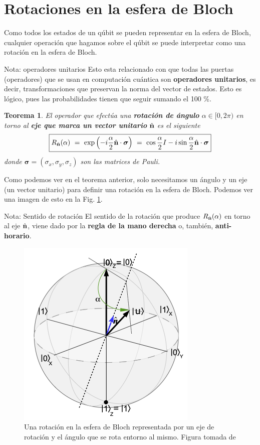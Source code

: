 \documentclass[a4paper,11pt]{book} %
\newtheorem{teorema_contador}{Teorema}
\newcommand{\Teorema}[1]{
		\begin{mybox_gray2}{}
			\begin{teorema_contador}
				 #1 
			\end{teorema_contador} 
		\end{mybox_gray2}
	}
\numberwithin{equation}{chapter}
\begin{document}
    \section{Rotaciones en la esfera de Bloch}

Como todos los estados de un qúbit se pueden representar en la esfera de Bloch, cualquier operación que hagamos sobre el qúbit se puede interpretar como una rotación en la esfera de Bloch.

	\begin{mybox_blue}{Nota: operadores unitarios}
	Esto esta relacionado con que todas las puertas (operadores) que se usan en computación cuántica son 
	\textbf{operadores unitarios}, es decir, transformaciones que preservan la norma
	del vector de estados. Esto es lógico, pues las probabilidades tienen que seguir 
	sumando el 100 \%. 
	\end{mybox_blue}
	

	\Teorema{
	El operador que efectúa una \textbf{rotación de ángulo}  $\alpha\in [0,2\pi)$ en torno al 
	\textbf{eje que marca un vector unitario} $\hat{\bf n}$ es el siguiente
	\begin{equation} \label{ec_puertas_simples_Rn}
	\boxed{R_{\hat{\bf n}}(\alpha)~ = ~\exp\left( -i\frac{\alpha}{2} \hat{\bf n}\cdot 
	\boldsymbol{\sigma} \right) ~=~ \cos \frac{\alpha}{2} I - i \sin\frac{\alpha}{2} 
	\hat{\bf n}\cdot\boldsymbol{\sigma} }
	\end{equation}
	donde $\boldsymbol{\sigma} = (\sigma_x, \sigma_y, \sigma_z)$ son las matrices de Pauli.
	}
	
Como podemos ver en el teorema anterior, solo necesitamos un ángulo y un eje (un vector unitario) para definir una rotación en la esfera de Bloch. Podemos ver una imagen de esto en la Fig. \ref{Fig_puertas_simples_BlochSphere_rot.png}. 


	\begin{mybox_blue}{Nota: Sentido de rotación}
	El sentido de la rotación que produce $R_{\hat{\bf n}}(\alpha)$ en torno al eje 
	$\hat{\bf n}$, viene dado por la \textbf{regla de la mano derecha} o, también, 
	\textbf{anti-horario}. 
	\end{mybox_blue}

	\begin{figure}[H]
	\centering 
	\includegraphics[width=0.3\linewidth]{Figuras/Fig_puertas_simples_BlochSphere_rot.png}
	\caption{Una rotación en la esfera de Bloch representada por un eje de rotación y el 
	ángulo que se rota entorno al mismo. Figura tomada de \cite{Curso-JMas}}
	\label{Fig_puertas_simples_BlochSphere_rot.png}
	\end{figure}
\end{document}

